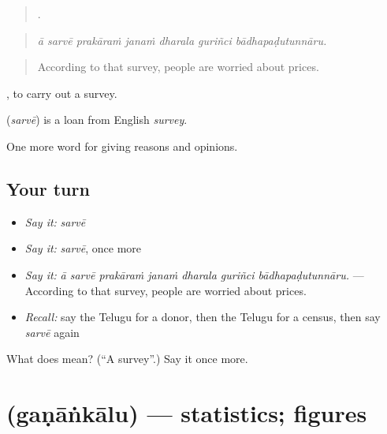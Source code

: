 \begin{quote}
      .
\end{quote}

\begin{quote}
\emph{ā sarvē prakāraṁ janaṁ dharala guriñci bādhapaḍutunnāru.}
\end{quote}

\begin{quote}
According to that survey, people are worried about prices.
\end{quote}

 , to carry out a survey.

\begin{cousinweb}
\textbf{} (\emph{sarvē}) is a loan from English \emph{survey}.
\end{cousinweb}

\begin{grammarlens}[title={What you've built}]
One more word for giving reasons and opinions.
\end{grammarlens}

\subsection*{Your turn}
\begin{itemize}
\raggedright
  \item \emph{Say it:} \emph{sarvē}
  \item \emph{Say it:} \emph{sarvē}, once more
  \item \emph{Say it:} \emph{ā sarvē prakāraṁ janaṁ dharala guriñci bādhapaḍutunnāru.} — According to that survey, people are worried about prices.
  \item \emph{Recall:} say the Telugu for a donor, then the Telugu for a census, then say \emph{sarvē} again
\end{itemize}

\begin{tcolorbox}[breakable,colback=teal!4,colframe=teal!35!black,title={Before you move on}]
What does  mean? (\textquotedblleft{}A survey\textquotedblright{}.) Say it once more.
\end{tcolorbox}
\section[\texorpdfstring{\te{గణాంకాలు} (gaṇāṅkālu)}{గణాంకాలు (gaṇāṅkālu)}]{ (gaṇāṅkālu) — statistics; figures}

